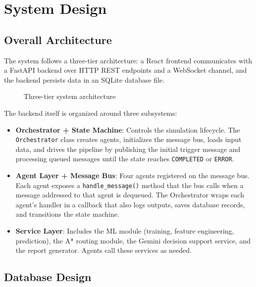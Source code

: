 \chapter{System Design}
\label{ch:system_design}

\section{Overall Architecture}
\label{sec:overall_architecture}

The system follows a three-tier architecture: a React frontend communicates with a FastAPI backend over HTTP REST endpoints and a WebSocket channel, and the backend persists data in an SQLite database file.

\begin{figure}[H]
\centering
{}
\caption{Three-tier system architecture}
\label{fig:architecture}
\end{figure}

The backend itself is organized around three subsystems:

\begin{itemize}[leftmargin=*]
    \item \textbf{Orchestrator + State Machine}: Controls the simulation lifecycle. The \texttt{Orchestrator} class creates agents, initializes the message bus, loads input data, and drives the pipeline by publishing the initial trigger message and processing queued messages until the state reaches \texttt{COMPLETED} or \texttt{ERROR}.

    \item \textbf{Agent Layer + Message Bus}: Four agents registered on the message bus. Each agent exposes a \texttt{handle\_message()} method that the bus calls when a message addressed to that agent is dequeued. The Orchestrator wraps each agent's handler in a callback that also logs outputs, saves database records, and transitions the state machine.

    \item \textbf{Service Layer}: Includes the ML module (training, feature engineering, prediction), the A* routing module, the Gemini decision support service, and the report generator. Agents call these services as needed.
\end{itemize}

\section{Database Design}
\label{sec:database_design}

